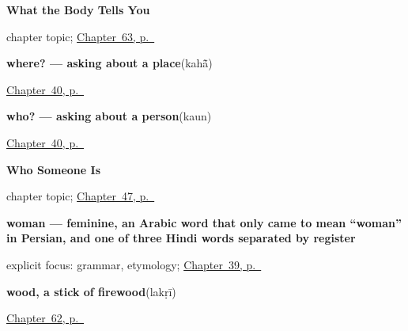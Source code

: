 \noindent\begin{minipage}[t]{\linewidth}
\raggedright
\textbf{What the Body Tells You}\par
\footnotesize chapter topic; \hyperref[ch:hi-what-the-body-tells-you]{Chapter~63, p.~\pageref*{ch:hi-what-the-body-tells-you}}
\end{minipage}\par\smallskip

\noindent\begin{minipage}[t]{\linewidth}
\raggedright
\textbf{where? — asking about a place}\enspace\emph{}\enspace(kahā̃)\par
\footnotesize \hyperref[ch:hi-pointing-and-asking]{Chapter~40, p.~\pageref*{ch:hi-pointing-and-asking}}
\end{minipage}\par\smallskip

\noindent\begin{minipage}[t]{\linewidth}
\raggedright
\textbf{who? — asking about a person}\enspace\emph{}\enspace(kaun)\par
\footnotesize \hyperref[ch:hi-pointing-and-asking]{Chapter~40, p.~\pageref*{ch:hi-pointing-and-asking}}
\end{minipage}\par\smallskip

\noindent\begin{minipage}[t]{\linewidth}
\raggedright
\textbf{Who Someone Is}\par
\footnotesize chapter topic; \hyperref[ch:hi-roles]{Chapter~47, p.~\pageref*{ch:hi-roles}}
\end{minipage}\par\smallskip

\noindent\begin{minipage}[t]{\linewidth}
\raggedright
\textbf{woman — feminine, an Arabic word that only came to mean \textquotedblleft{}woman\textquotedblright{} in Persian, and one of three Hindi words separated by register}\enspace\emph{}\par
\footnotesize explicit focus: grammar, etymology; \hyperref[ch:hi-people-around-you]{Chapter~39, p.~\pageref*{ch:hi-people-around-you}}
\end{minipage}\par\smallskip

\noindent\begin{minipage}[t]{\linewidth}
\raggedright
\textbf{wood, a stick of firewood}\enspace\emph{}\enspace(lakṛī)\par
\footnotesize \hyperref[ch:hi-what-hands-work-with]{Chapter~62, p.~\pageref*{ch:hi-what-hands-work-with}}
\end{minipage}\par\smallskip

